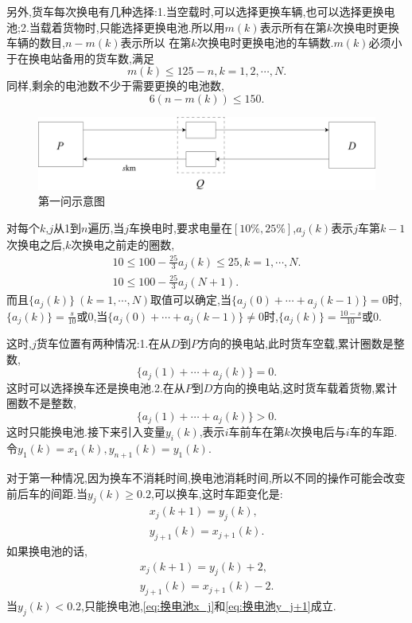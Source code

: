 \documentclass[12pt,a4paper,oneside]{ctexart}
\begin{document}
另外,货车每次换电有几种选择:1.当空载时,可以选择更换车辆,也可以选择更换电池;2.当载着货物时,只能选择更换电池.所以用$m(k)$表示所有在第$k$次换电时更换车辆的数目,$n-m(k)$表示所以
在第$k$次换电时更换电池的车辆数.$m(k)$必须小于在换电站备用的货车数,满足
\begin{equation}
  m(k)\leqslant 125-n,k=1,2,\cdots,N.
\end{equation}
同样,剩余的电池数不少于需要更换的电池数,
\begin{equation}
  6(n-m(k))\leqslant 150.
\end{equation}

\begin{figure}[H]
  \centering
  \includegraphics[scale=0.25]{资源 1.pdf}
  \caption{第一问示意图}
\end{figure}

对每个$k$,$j$从1到$n$遍历,当$j$车换电时,要求电量在$[10\%,25\%]$,$a_j(k)$表示$j$车第$k-1$次换电之后,$k$次换电之前走的圈数,
\begin{gather}
  10\leqslant 100-\frac{25}{3}a_j(k)\leqslant 25,k=1,\cdots,N.\\
  10\leqslant 100-\frac{25}{3}a_j(N+1).
\end{gather}
而且$\{a_j(k)\}\ (k=1,\cdots,N)$取值可以确定,当$\{a_j(0)+\cdots+a_j(k-1)\}=0$时,$\{a_j(k)\}=\frac{s}{10}$或0,当$\{a_j(0)+\cdots+a_j(k-1)\}\neq 0$时,$\{a_j(k)\}=\frac{10-s}{10}$或0.

这时,$j$货车位置有两种情况:1.在从$D$到$P$方向的换电站,此时货车空载,累计圈数是整数,
\begin{equation}
  \{a_j(1)+\cdots+a_j(k)\}=0.
\end{equation}
这时可以选择换车还是换电池.2.在从$P$到$D$方向的换电站,这时货车载着货物,累计圈数不是整数,
\begin{equation}
  \{a_j(1)+\cdots+a_j(k)\}>0.
\end{equation}
这时只能换电池.接下来引入变量$y_i(k)$,表示$i$车前车在第$k$次换电后与$i$车的车距.令$y_1(k)=x_1(k),y_{n+1}(k)=y_1(k)$.

对于第一种情况,因为换车不消耗时间,换电池消耗时间,所以不同的操作可能会改变前后车的间距.当$y_j(k)\geqslant 0.2$,可以换车,这时车距变化是:
\begin{gather}
  x_j(k+1)=y_j(k),\\
  y_{j+1}(k)=x_{j+1}(k).
\end{gather}
如果换电池的话,
\begin{gather}
  x_j(k+1)=y_j(k)+2,\label{eq:换电池x_j}\\
  y_{j+1}(k)=x_{j+1}(k)-2.\label{eq:换电池y_j+1}
\end{gather}
当$y_j(k)<0.2$,只能换电池,\eqref{eq:换电池x_j}和\eqref{eq:换电池y_j+1}成立.
\end{document}
